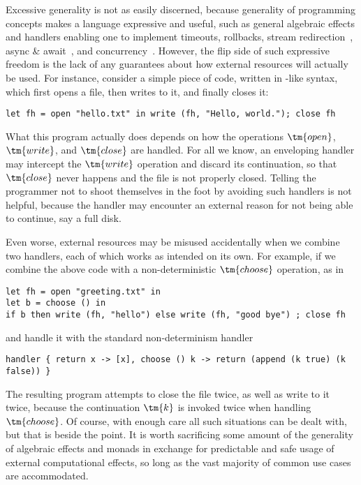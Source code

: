Excessive generality is not as easily discerned, because generality of programming concepts makes a language expressive and useful, 
such as general algebraic effects and handlers enabling one to implement timeouts, rollbacks, stream redirection~\cite{Plotkin:HandlingEffects}, async \& await~\cite{Leijen:AsyncAwait}, and concurrency~\cite{Dolan:MulticoreOCaml}. However, the flip side of such expressive freedom is the lack of any guarantees about how external resources will actually be used.
%
For instance, consider a simple piece of code, written in -like syntax, which first opens a file, then writes to it, and finally closes it:
%
\begin{lstlisting}
let fh = open "hello.txt" in write (fh, "Hello, world."); close fh
\end{lstlisting}

What this program actually does depends on how the operations $\tm{open}$, $\tm{write}$, and $\tm{close}$ are handled. For all we know, an enveloping handler may intercept the $\tm{write}$ operation and discard its continuation, so that $\tm{close}$ never happens and the file is not properly closed. 
Telling the programmer not to shoot themselves in the foot by avoiding such handlers is not helpful, because the handler may encounter an external reason for not being able to continue, say a full disk.

Even worse, external resources may be misused accidentally when we combine two handlers, each of which works as intended on its own. 
For example, if we combine the above code with a non-deterministic $\tm{choose}$ operation, as in
%
\begin{lstlisting}
let fh = open "greeting.txt" in
let b = choose () in
if b then write (fh, "hello") else write (fh, "good bye") ; close fh
\end{lstlisting}
%
and handle it with the standard non-determinism handler
%
\begin{lstlisting}
handler { return x -> [x], choose () k -> return (append (k true) (k false)) }
\end{lstlisting}
%
The resulting program attempts to close the file twice, as well as write to it twice, because the continuation $\tm{k}$ is invoked twice when handling $\tm{choose}$.
%
Of course, with enough care all such situations can be dealt with, but that is beside the point. It is worth sacrificing some amount of the generality of algebraic effects and monads in exchange for predictable and safe usage of external computational effects, so long as the vast majority of common use cases are accommodated.

